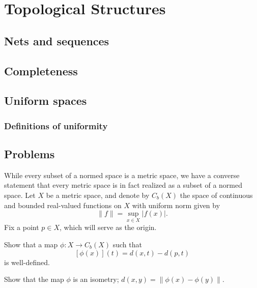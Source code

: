 \documentclass{../note}
\begin{document}
\part{Topological Structures}

\chapter{Nets and sequences}

\chapter{Completeness}

\chapter{Uniform spaces}

\section{Definitions of uniformity}






\chapter*{Problems}

\begin{prb}
While every subset of a normed space is a metric space, we have a converse statement that every metric space is in fact realized as a subset of a normed space.
Let $X$ be a metric space, and denote by $C_b(X)$ the space of continuous and bounded real-valued functions on $X$ with uniform norm given by
\[\|f\|=\sup_{x\in X}|f(x)|.\]
Fix a point $p\in X$, which will serve as the origin.
\begin{parts}
\item Show that a map $\phi:X\to C_b(X)$ such that
\[[\phi(x)](t)=d(x,t)-d(p,t)\]
is well-defined.
\item Show that the map $\phi$ is an isometry; $d(x,y)=\|\phi(x)-\phi(y)\|$.
\end{parts}
\end{prb}
\end{document}
